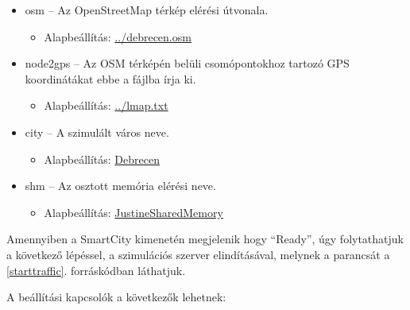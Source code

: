 \documentclass[a4paper,12pt]{report}
\begin{document}
\begin{itemize}
\item osm -- Az OpenStreetMap térkép elérési útvonala.
	\begin{itemize}
	\item Alapbeállítás: \url{../debrecen.osm}
	\end{itemize}
\item node2gps -- Az OSM térképén belüli csomópontokhoz tartozó GPS koordinátákat ebbe a fájlba írja ki.
	\begin{itemize}
	\item Alapbeállítás: \url{../lmap.txt}
	\end{itemize}
\item city -- A szimulált város neve.
	\begin{itemize}
	\item Alapbeállítás: \url{Debrecen}
	\end{itemize}
\item shm -- Az osztott memória elérési neve.
	\begin{itemize}
	\item Alapbeállítás: \url{JustineSharedMemory}
	\end{itemize}
\end{itemize}

\vspace{2mm}
Amennyiben a SmartCity kimenetén megjelenik hogy ``Ready'', úgy folytathatjuk a következő lépéssel, a szimulációs szerver elindításával, melynek a parancsát a \ref{starttraffic}. forráskódban láthatjuk.



A beállítási kapcsolók a következők lehetnek:
\end{document}
